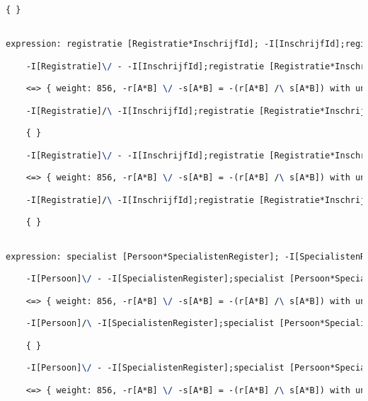\begin{lstlisting}[language=TeX]
    { }


expression: registratie [Registratie*InschrijfId]; -I[InschrijfId];registratie [Registratie*InschrijfId]~ |- -I[Registratie]

    -I[Registratie]\/ - -I[InschrijfId];registratie [Registratie*InschrijfId]~;registratie [Registratie*InschrijfId]

    <=> { weight: 856, -r[A*B] \/ -s[A*B] = -(r[A*B] /\ s[A*B]) with unifier: {A->I[Registratie], B->I[Registratie], r->registratie [Registratie*InschrijfId];-I[InschrijfId];registratie [Registratie*InschrijfId]~, s->I[Registratie]} }

    -I[Registratie]/\ -I[InschrijfId];registratie [Registratie*InschrijfId]~;registratie [Registratie*InschrijfId]

    { }

    -I[Registratie]\/ - -I[InschrijfId];registratie [Registratie*InschrijfId]~;registratie [Registratie*InschrijfId]

    <=> { weight: 856, -r[A*B] \/ -s[A*B] = -(r[A*B] /\ s[A*B]) with unifier: {A->I[Registratie], B->I[Registratie], r->I[Registratie], s->registratie [Registratie*InschrijfId];-I[InschrijfId];registratie [Registratie*InschrijfId]~} }

    -I[Registratie]/\ -I[InschrijfId];registratie [Registratie*InschrijfId]~;registratie [Registratie*InschrijfId]

    { }


expression: specialist [Persoon*SpecialistenRegister]; -I[SpecialistenRegister];specialist [Persoon*SpecialistenRegister]~ |- -I[Persoon]

    -I[Persoon]\/ - -I[SpecialistenRegister];specialist [Persoon*SpecialistenRegister]~;specialist [Persoon*SpecialistenRegister]

    <=> { weight: 856, -r[A*B] \/ -s[A*B] = -(r[A*B] /\ s[A*B]) with unifier: {A->I[Persoon], B->I[Persoon], r->specialist [Persoon*SpecialistenRegister];-I[SpecialistenRegister];specialist [Persoon*SpecialistenRegister]~, s->I[Persoon]} }

    -I[Persoon]/\ -I[SpecialistenRegister];specialist [Persoon*SpecialistenRegister]~;specialist [Persoon*SpecialistenRegister]

    { }

    -I[Persoon]\/ - -I[SpecialistenRegister];specialist [Persoon*SpecialistenRegister]~;specialist [Persoon*SpecialistenRegister]

    <=> { weight: 856, -r[A*B] \/ -s[A*B] = -(r[A*B] /\ s[A*B]) with unifier: {A->I[Persoon], B->I[Persoon], r->I[Persoon], s->specialist [Persoon*SpecialistenRegister];-I[SpecialistenRegister];specialist [Persoon*SpecialistenRegister]~} }


\end{lstlisting}
